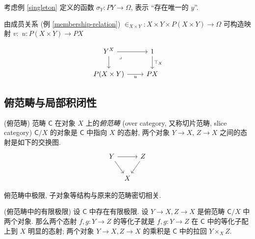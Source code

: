 考虑例 \ref{singleton} 定义的函数 $\sigma_Y\colon PY\to\Omega$, 表示 ``存在唯一的 $y$''.

由成员关系 (例 \ref{membership-relation}) $\in_{X\times Y}\colon X\times Y \times P(X\times Y) \to \Omega$ 可构造映射
$v\colon $
$u\colon P(X\times Y) \to PX$

\[\begin{tikzcd}[ampersand replacement=\&]
	{Y^X} \& 1 \\
	{P(X\times Y)} \& PX
	\arrow[from=1-1, to=1-2]
	\arrow["{\top_X}", from=1-2, to=2-2]
	\arrow[from=1-1, to=2-1]
	\arrow["u"', from=2-1, to=2-2]
	\arrow["\lrcorner"{anchor=center, pos=0.125}, draw=none, from=1-1, to=2-2]
\end{tikzcd}\]


\subsection{俯范畴与局部积闭性}

\label{slice-category}

\begin{definition}
    [label={over-category}]
    {(俯范畴)}
    范畴 $\mathsf C$ 在对象 $X$ 上的\emph{俯范畴} (over category, 又称切片范畴, slice category) $\mathsf C/X$ 的对象是 $\mathsf C$ 中指向 $X$ 的态射, 两个对象 $Y\to X$, $Z \to X$ 之间的态射是如下的交换图.
    \[\begin{tikzcd}[ampersand replacement=\&,column sep=tiny]
    	Y \&\& Z \\
    	\& X
    	\arrow[from=1-1, to=1-3]
    	\arrow[from=1-1, to=2-2]
    	\arrow[from=1-3, to=2-2]
    \end{tikzcd}\]
\end{definition}

俯范畴中极限, 子对象等结构与原来的范畴密切相关.

\begin{prop}
    {(俯范畴中的有限极限)}
    设 $\mathsf C$ 中存在有限极限. 设 $Y\to X,Z\to X$ 是俯范畴 $\mathsf C/X$ 中两个对象.
    那么两个态射 $f,g \colon Y \to Z$ 的等化子就是 $f,g \colon Y \to Z$ 在 $\mathsf C$ 中的等化子配上到 $X$ 明显的态射;
    两个对象 $Y\to X, Z\to X$ 的乘积是 $\mathsf C$ 中的拉回 $Y\times_X Z$.
\end{prop}

